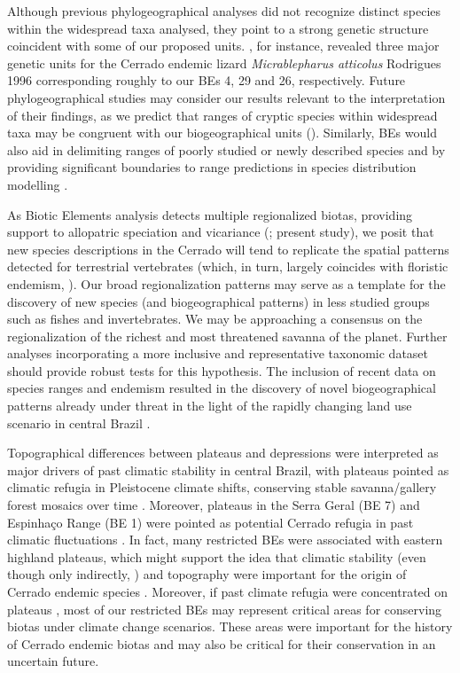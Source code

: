 \documentclass[12pt,openright,oneside,a4paper,english]{abntex2}
\begin{document}
Although previous phylogeographical analyses \citep{Santos2014, LimaRezende2019, Vasconcellos2019} did not recognize distinct species within the widespread taxa analysed, they point to a strong genetic structure coincident with some of our proposed units. \citet{Santos2014}, for instance, revealed three major genetic units for the Cerrado endemic lizard \textit{Micrablepharus atticolus} Rodrigues 1996 corresponding roughly  to our BEs 4, 29 and 26, respectively. Future phylogeographical studies may consider our results relevant to the interpretation of their findings, as we predict that ranges of cryptic species within widespread taxa may be congruent with our biogeographical units (\citealp[see][]{Vasconcellos2019}). Similarly, BEs would also aid in delimiting ranges of poorly studied or newly described species and by providing significant boundaries to range predictions in species distribution modelling \citep{Franklin2010, Raxworthy2003}.

As Biotic Elements analysis detects multiple regionalized biotas, providing support to allopatric speciation and vicariance (\citealp[][]{Hausdorf2003, Nogueira2011, Azevedo2016}; present study), we posit that new species descriptions in the Cerrado will tend to replicate the spatial patterns detected for terrestrial vertebrates (which, in turn, largely coincides with floristic endemism, \citealp[see][]{Simon2000}). Our broad regionalization patterns may serve as a template for the discovery of new species (and biogeographical patterns) in less studied groups such as fishes and invertebrates. We may be approaching a consensus on the regionalization of the richest and most threatened savanna of the planet. Further analyses incorporating a more inclusive and representative taxonomic dataset should provide robust tests for this hypothesis. The inclusion of recent data on species ranges and endemism resulted in the discovery of novel biogeographical patterns already under threat in the light of the rapidly changing land use scenario in central Brazil \citep{Strassburg2017, Liuetal2022}.

Topographical differences between plateaus and depressions were interpreted as major drivers of past climatic stability in central Brazil, with plateaus pointed as climatic refugia in Pleistocene climate shifts, conserving stable savanna/gallery forest mosaics over time \citep{BrownGiff2002, Vasconcellos2019}. Moreover, plateaus in the Serra Geral (BE 7) and Espinhaço Range (BE 1) were pointed as potential Cerrado refugia in past climatic fluctuations \citep{Werneck2012}. In fact, many restricted BEs were associated with eastern highland plateaus, which might support the idea that climatic stability (even though only indirectly, \citealp[see][]{Marin2018}) and topography were important for the origin of Cerrado endemic species \citep{Silva1997, LimaRezende2019, Vasconcellos2019}. Moreover, if past climate refugia were concentrated on plateaus \citep{Werneck2012}, most of our restricted BEs may represent critical areas for conserving biotas under climate change scenarios. These areas were important for the history of Cerrado endemic biotas and may also be critical for their conservation in an uncertain future.
\end{document}
